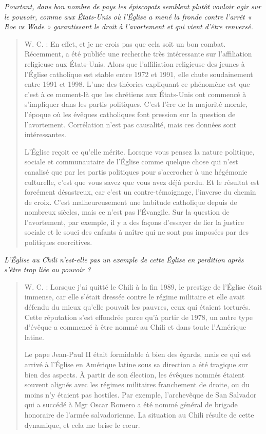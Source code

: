 \textit{Pourtant, dans bon nombre de pays les épiscopats semblent plutôt vouloir agir sur le pouvoir, comme aux États-Unis où l’Église a mené la fronde contre l’arrêt « Roe vs Wade » garantissant le droit à l’avortement et qui vient d’être renversé.}
\begin{quote}
    

W. C. : En effet, et je ne crois pas que cela soit un bon combat. Récemment, a été publiée une recherche très intéressante sur l’affiliation religieuse aux États-Unis. Alors que l’affiliation religieuse des jeunes à l’Église catholique est stable entre 1972 et 1991, elle chute soudainement entre 1991 et 1998. L’une des théories expliquant ce phénomène est que c’est à ce moment-là que les chrétiens aux États-Unis ont commencé à s’impliquer dans les partis politiques. C’est l’ère de la majorité morale, l’époque où les évêques catholiques font pression sur la question de l’avortement. Corrélation n’est pas causalité, mais ces données sont intéressantes.

 
L’Église reçoit ce qu’elle mérite. Lorsque vous pensez la nature politique, sociale et communautaire de l’Église comme quelque chose qui n’est canalisé que par les partis politiques pour s’accrocher à une hégémonie culturelle, c’est que vous savez que vous avez déjà perdu. Et le résultat est forcément désastreux, car c’est un contre-témoignage, l’inverse du chemin de croix. C’est malheureusement une habitude catholique depuis de nombreux siècles, mais ce n’est pas l’Évangile. Sur la question de l’avortement, par exemple, il y a des façons d’essayer de lier la justice sociale et le souci des enfants à naître qui ne sont pas imposées par des politiques coercitives.
\end{quote}

\textit{
L’Église au Chili n’est-elle pas un exemple de cette Église en perdition après s’être trop liée au pouvoir ?
}
\begin{quote}
    

W. C. : Lorsque j’ai quitté le Chili à la fin 1989, le prestige de l’Église était immense, car elle s’était dressée contre le régime militaire et elle avait défendu du mieux qu’elle pouvait les pauvres, ceux qui étaient torturés. Cette réputation s’est effondrée parce qu’à partir de 1978, un autre type d’évêque a commencé à être nommé au Chili et dans toute l’Amérique latine.

Le pape Jean-Paul II était formidable à bien des égards, mais ce qui est arrivé à l’Église en Amérique latine sous sa direction a été tragique sur bien des aspects. À partir de son élection, les évêques nommés étaient souvent alignés avec les régimes militaires franchement de droite, ou du moins n’y étaient pas hostiles. Par exemple, l’archevêque de San Salvador qui a succédé à Mgr Oscar Romero a été nommé général de brigade honoraire de l’armée salvadorienne. La situation au Chili résulte de cette dynamique, et cela me brise le cœur.
\end{quote}

